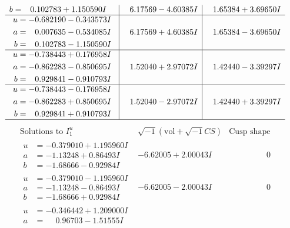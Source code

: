 \documentclass[1p]{elsarticle_modified}
\theoremstyle{definition}
\newcommand{\I}{\sqrt{-1}}
\begin{document}
$$\begin{array}{c|c|c}
\begin{aligned}
b &= \phantom{-}0.102783 + 1.150590 I\end{aligned}
 & \phantom{-}6.17569 - 4.60385 I & \phantom{-}1.65384 + 3.69650 I \\ \hline\begin{aligned}
u &= -0.682190 - 0.343573 I \\
a &= \phantom{-}0.007635 - 0.534085 I \\
b &= \phantom{-}0.102783 - 1.150590 I\end{aligned}
 & \phantom{-}6.17569 + 4.60385 I & \phantom{-}1.65384 - 3.69650 I \\ \hline\begin{aligned}
u &= -0.738443 + 0.176958 I \\
a &= -0.862283 - 0.850695 I \\
b &= \phantom{-}0.929841 - 0.910793 I\end{aligned}
 & \phantom{-}1.52040 + 2.97072 I & \phantom{-}1.42440 - 3.39297 I \\ \hline\begin{aligned}
u &= -0.738443 - 0.176958 I \\
a &= -0.862283 + 0.850695 I \\
b &= \phantom{-}0.929841 + 0.910793 I\end{aligned}
 & \phantom{-}1.52040 - 2.97072 I & \phantom{-}1.42440 + 3.39297 I\\
 \hline 
 \end{array}$$\newpage$$\begin{array}{c|c|c}  
\text{Solutions to }I^u_{1}& \I (\text{vol} + \sqrt{-1}CS) & \text{Cusp shape}\\
 \hline 
\begin{aligned}
u &= -0.379010 + 1.195960 I \\
a &= -1.13248 + 0.86493 I \\
b &= -1.68666 - 0.92984 I\end{aligned}
 & -6.62005 + 2.00043 I & \phantom{-0.000000 } 0 \\ \hline\begin{aligned}
u &= -0.379010 - 1.195960 I \\
a &= -1.13248 - 0.86493 I \\
b &= -1.68666 + 0.92984 I\end{aligned}
 & -6.62005 - 2.00043 I & \phantom{-0.000000 } 0 \\ \hline\begin{aligned}
u &= -0.346442 + 1.209000 I \\
a &= \phantom{-}0.96703 - 1.51555 I \\

\end{aligned}
\end{array}$$
\end{document}

